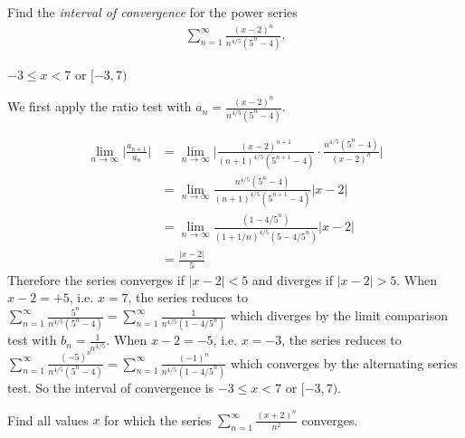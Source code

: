 \begin{Mquestion}[2015A]
 Find the {\em interval of convergence} for the power series
\begin{align*}
\sum_{n=1}^\infty \frac{(x-2)^n}{n^{4/5}(5^n-4)}.
\end{align*}
\end{Mquestion}


\begin{answer}
 $-3\le x< 7$ or $[-3,7)$
\end{answer}

\begin{solution}
We first apply the ratio test with $a_n = \frac{(x-2)^n}{n^{4/5}(5^n-4)}$.

\begin{align*}
\lim_{n\rightarrow\infty}\Big|\frac{a_{n+1}}{a_n}\Big|
&=\lim_{n\rightarrow\infty}\bigg|\frac{(x-2)^{n+1}}{(n+1)^{4/5}(5^{n+1}-4)}\cdot
                               \frac{n^{4/5}(5^n-4)}{(x-2)^n}\bigg|\\
&=\lim_{n\rightarrow\infty}\frac{n^{4/5}(5^n-4)}{(n+1)^{4/5}(5^{n+1}-4)}
                               |x-2|\\
&=\lim_{n\rightarrow\infty}\frac{(1-4/5^n)}{(1+1/n)^{4/5}(5-4/5^n)}
                               |x-2|\\
&=\frac{|x-2|}{5}
\end{align*}
Therefore the series converges if $|x-2|<5$ and diverges if $|x-2|>5$.
When $x-2=+5$, i.e. $x=7$, the series reduces to
$\sum\limits_{n=1}^\infty \frac{5^n}{n^{4/5}(5^n-4)}
 =\sum\limits_{n=1}^\infty \frac{1}{n^{4/5}(1-4/5^n)}$
which diverges by the limit comparison test with $b_n=\frac{1}{n^{4/5}}$.
When $x-2=-5$, i.e. $x=-3$, the series reduces to
$\sum\limits_{n=1}^\infty \frac{(-5)^n}{n^{4/5}(5^n-4)}
 =\sum\limits_{n=1}^\infty \frac{(-1)^n}{n^{4/5}(1-4/5^n)}$
which converges by the alternating series test. So the interval
of convergence is $-3\le x< 7$ or $[-3,7)$.

\end{solution}

\begin{question}[2016Q6]
Find all values $x$ for which the series
$\displaystyle\sum_{n=1}^\infty\frac{(x+2)^n}{n^2}$ converges.
\end{question}


